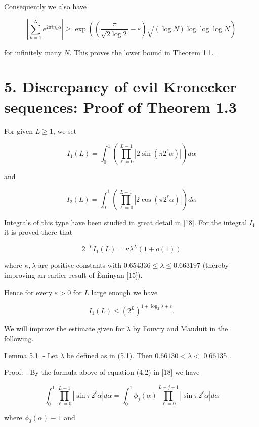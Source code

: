 \documentclass[10pt]{article}
\newcommand{\1}{\mathbf{1}}
\begin{document}
Consequently we also have

$$
\left|\sum_{k=1}^{N} e^{2 \pi i n_{k} \alpha}\right| \geqslant \exp \left(\left(\frac{\pi}{\sqrt{2\log 2}}-\varepsilon\right) \sqrt{(\log N) \log \log \log N}\right)
$$

for infinitely many $N$. This proves the lower bound in Theorem 1.1. \(\square\)

\section*{5. Discrepancy of evil Kronecker sequences: Proof of Theorem 1.3}
For given $L \geqslant 1$, we set

$$
I_{1}(L)=\int_{0}^{1}\left(\prod_{\ell=0}^{L-1}\left|2 \sin \left(\pi 2^{\ell} \alpha\right)\right|\right) d \alpha
$$

and

$$
I_{2}(L)=\int_{0}^{1}\left(\prod_{\ell=0}^{L-1}\left|2 \cos \left(\pi 2^{\ell} \alpha\right)\right|\right) d \alpha
$$

Integrals of this type have been studied in great detail in [18]. For the integral $I_{1}$ it is proved there that


\begin{equation*}
2^{-L} I_{1}(L)=\kappa \lambda^{L}(1+o(1)) \tag{5.1}
\end{equation*}


where $\kappa, \lambda$ are positive constants with $0.654336 \leqslant \lambda \leqslant 0.663197$ (thereby improving an earlier result of Èminyan [15]).

Hence for every $\varepsilon>0$ for $L$ large enough we have


\begin{equation*}
I_{1}(L) \leqslant\left(2^{L}\right)^{1+\log _{2} \lambda+\varepsilon} . \tag{5.2}
\end{equation*}


We will improve the estimate given for $\lambda$ by Fouvry and Mauduit in the following.

Lemma 5.1. - Let $\lambda$ be defined as in (5.1). Then $0.66130<\lambda<$ 0.66135 .

Proof. - By the formula above of equation (4.2) in [18] we have

$$
\int_{0}^{1} \prod_{\ell=0}^{L-1}\left|\sin \pi 2^{\ell} \alpha\right| d \alpha=\int_{0}^{1} \phi_{j}(\alpha) \prod_{\ell=0}^{L-j-1}\left|\sin \pi 2^{\ell} \alpha\right| d \alpha
$$

where $\phi_{0}(\alpha) \equiv 1$ and
\end{document}
